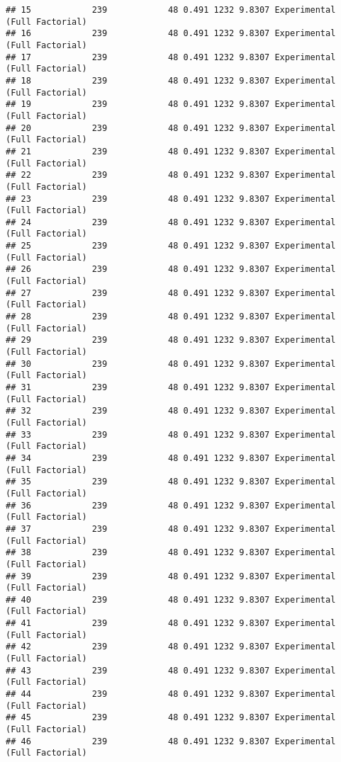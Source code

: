 \documentclass[]{article}
\begin{document}
\begin{verbatim}
## 15            239            48 0.491 1232 9.8307 Experimental (Full Factorial)
## 16            239            48 0.491 1232 9.8307 Experimental (Full Factorial)
## 17            239            48 0.491 1232 9.8307 Experimental (Full Factorial)
## 18            239            48 0.491 1232 9.8307 Experimental (Full Factorial)
## 19            239            48 0.491 1232 9.8307 Experimental (Full Factorial)
## 20            239            48 0.491 1232 9.8307 Experimental (Full Factorial)
## 21            239            48 0.491 1232 9.8307 Experimental (Full Factorial)
## 22            239            48 0.491 1232 9.8307 Experimental (Full Factorial)
## 23            239            48 0.491 1232 9.8307 Experimental (Full Factorial)
## 24            239            48 0.491 1232 9.8307 Experimental (Full Factorial)
## 25            239            48 0.491 1232 9.8307 Experimental (Full Factorial)
## 26            239            48 0.491 1232 9.8307 Experimental (Full Factorial)
## 27            239            48 0.491 1232 9.8307 Experimental (Full Factorial)
## 28            239            48 0.491 1232 9.8307 Experimental (Full Factorial)
## 29            239            48 0.491 1232 9.8307 Experimental (Full Factorial)
## 30            239            48 0.491 1232 9.8307 Experimental (Full Factorial)
## 31            239            48 0.491 1232 9.8307 Experimental (Full Factorial)
## 32            239            48 0.491 1232 9.8307 Experimental (Full Factorial)
## 33            239            48 0.491 1232 9.8307 Experimental (Full Factorial)
## 34            239            48 0.491 1232 9.8307 Experimental (Full Factorial)
## 35            239            48 0.491 1232 9.8307 Experimental (Full Factorial)
## 36            239            48 0.491 1232 9.8307 Experimental (Full Factorial)
## 37            239            48 0.491 1232 9.8307 Experimental (Full Factorial)
## 38            239            48 0.491 1232 9.8307 Experimental (Full Factorial)
## 39            239            48 0.491 1232 9.8307 Experimental (Full Factorial)
## 40            239            48 0.491 1232 9.8307 Experimental (Full Factorial)
## 41            239            48 0.491 1232 9.8307 Experimental (Full Factorial)
## 42            239            48 0.491 1232 9.8307 Experimental (Full Factorial)
## 43            239            48 0.491 1232 9.8307 Experimental (Full Factorial)
## 44            239            48 0.491 1232 9.8307 Experimental (Full Factorial)
## 45            239            48 0.491 1232 9.8307 Experimental (Full Factorial)
## 46            239            48 0.491 1232 9.8307 Experimental (Full Factorial)

\end{verbatim}
\end{document}
